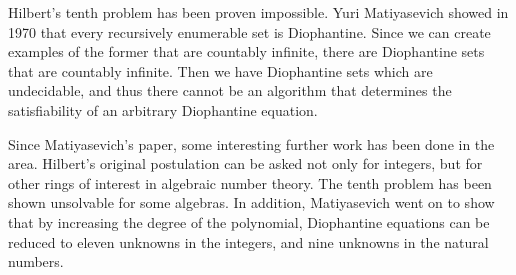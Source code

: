 \documentclass[12pt]{amsart}
\theoremstyle{case}
\begin{document}
	Hilbert's tenth problem has been proven impossible. Yuri Matiyasevich showed in 1970 that every recursively enumerable set is Diophantine. Since we can create examples of the former that are countably infinite, there are Diophantine sets that are countably infinite. Then we have Diophantine sets which are undecidable, and thus there cannot be an algorithm that determines the satisfiability of an arbitrary Diophantine equation.
	
	Since Matiyasevich's paper, some interesting further work has been done in the area. Hilbert's original postulation can be asked not only for integers, but for other rings of interest in algebraic number theory. The tenth problem has been shown unsolvable for some algebras. In addition, Matiyasevich went on to show that by increasing the degree of the polynomial, Diophantine equations can be reduced to eleven unknowns in the integers, and nine unknowns in the natural numbers.
	
	
	
	
\end{document}
